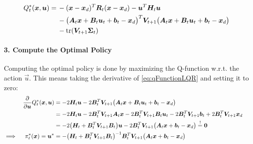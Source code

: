 					\begin{equation*}
						\begin{aligned}
							Q_t^\ast(\bm{x}, \bm{u}) =
							 & \, -(\bm{x} - \bm{x}_d)^T \bm{R}_t (\bm{x} - \bm{x}_d) - \bm{u}^T \bm{H}_t \bm{u}                                                                                     \\
							 & \, -\big( \bm{A}_t \bm{x} + \bm{B}_t \bm{u}_t + \bm{b}_t - \bm{x}_d \big)^T \bm{V}_{t + 1} \big( \bm{A}_t \bm{x} + \bm{B}_t \bm{u}_t + \bm{b}_t - \bm{x}_d \big) \\
							 & \, -\tr(\bm{V}_{t + 1} \bm{\Sigma}_t)
						\end{aligned}  \label{eq:qFunctionLQR}
					\end{equation*}

				\paragraph{3. Compute the Optimal Policy}
					Computing the optimal policy is done by maximizing the Q-function w.r.t. the action \(\vec{u}\). This means taking the derivative of \eqref{eq:qFunctionLQR} and setting it to zero:
					\begin{align*}
						         &                                                                                                                                    & \pdv{\bm{u}} Q_t^\ast(\bm{x}, \bm{u})
						         & = -2 \bm{H}_t \bm{u} - 2 \bm{B}_t^T \bm{V}_{t + 1} \big( \bm{A}_t \bm{x} + \bm{B}_t \bm{u}_t + \bm{b}_t - \bm{x}_d \big) &                                                                                                                                                                                                                                                               \\
						         &                                                                                                                                    &                                          & = -2 \bm{H}_t \bm{u} - 2 \bm{B}_t^T \bm{V}_{t + 1} \bm{A}_t \bm{x} - 2 \bm{B}_t^T \bm{V}_{t + 1} \bm{B}_t \bm{u}_t - 2 \bm{B}_t^T \bm{V}_{t + 1} \bm{b}_t + 2 \bm{B}_t^T \bm{V}_{t + 1} \bm{x}_d & \\
						         &                                                                                                                                    &                                          & = -2 \big( \bm{H}_t + \bm{B}_t^T \bm{V}_{t + 1} \bm{B}_t \big) \bm{u} - 2 \bm{B}_t^T \bm{V}_{t + 1} \big( \bm{A}_t \bm{x} + \bm{b}_t - \bm{x}_d \big) \overset{!}{=} \bm{0}                          & \\
						\implies &                                                                                                                                    & \pi_t^\ast(\bm{x}) = \bm{u}^\ast       & = -\big( \bm{H}_t + \bm{B}_t^T \bm{V}_{t + 1} \bm{B}_t \big)^{-1} \bm{B}_t^T \bm{V}_{t + 1} \big( \bm{A}_t \bm{x} + \bm{b}_t - \bm{x}_d \big)                                                          &
					\end{align*}

